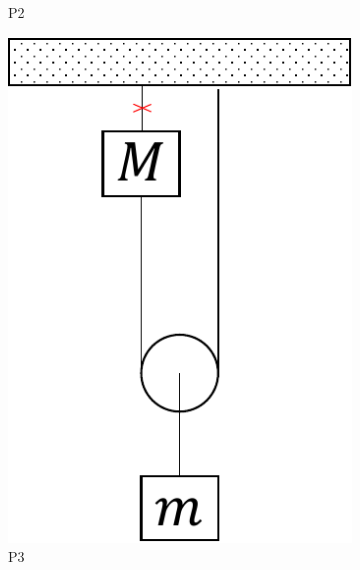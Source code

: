 \documentclass[letterpaper,11pt]{article}
\begin{document}
\begin{enumerate}
\begin{figure}[h!]
\begin{subfigure}[t]{0.15\textwidth}
        \caption{P2}
        \label{fig:p2}
    \end{subfigure}
    \hspace{0.5em}
    \begin{subfigure}[t]{0.4\textwidth}
        \centering
        \includegraphics[width=0.4\linewidth]{2021-1/Imagenes/aux6/p3.pdf}
        \caption{P3}
        \label{fig:p3}
    \end{subfigure}
    \caption{}
\end{figure}


\end{enumerate}
\end{document}
